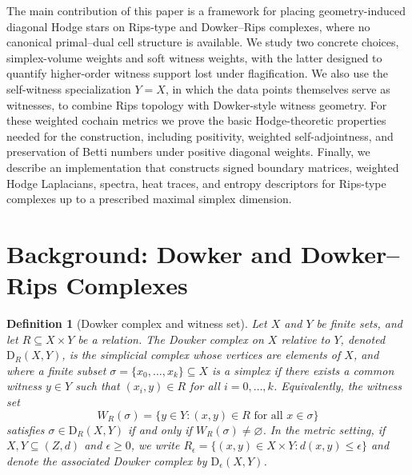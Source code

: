 \documentclass[11pt]{amsart}
\theoremstyle{plain}
\newtheorem{definition}[theorem]{Definition}
\newcommand{\Dow}{\mathrm{D}}
\begin{document}
The main contribution of this paper is a framework for placing geometry-induced diagonal Hodge stars
on Rips-type and Dowker--Rips complexes, where no canonical primal--dual cell structure is
available. We study two concrete choices, simplex-volume weights and soft witness weights, with the
latter designed to quantify higher-order witness support lost under flagification. We also use the
self-witness specialization $Y=X$, in which the data points themselves serve as witnesses, to combine
Rips topology with Dowker-style witness geometry. For these weighted cochain metrics we prove the
basic Hodge-theoretic properties needed for the construction, including positivity, weighted
self-adjointness, and preservation of Betti numbers under positive diagonal weights. Finally, we
describe an implementation that constructs signed boundary matrices, weighted Hodge Laplacians,
spectra, heat traces, and entropy descriptors for Rips-type complexes up to a prescribed maximal
simplex dimension.

\section{Background: Dowker and Dowker--Rips Complexes}
\label{sec:background}

\begin{definition}[Dowker complex and witness set]
Let $X$ and $Y$ be finite sets, and let $R\subseteq X\times Y$ be a relation. The Dowker complex on
$X$ relative to $Y$, denoted $\Dow_R(X,Y)$, is the simplicial complex whose vertices are elements
of $X$, and where a finite subset $\sigma=\{x_0,\dots,x_k\}\subseteq X$ is a simplex if there
exists a common witness $y\in Y$ such that $(x_i,y)\in R$ for all $i=0,\dots,k$. Equivalently, the
witness set
\[
W_R(\sigma)=\{y\in Y : (x,y)\in R \text{ for all }x\in\sigma\}
\]
satisfies $\sigma\in\Dow_R(X,Y)$ if and only if $W_R(\sigma)\neq\varnothing$. In the metric
setting, if $X,Y\subseteq (Z,d)$ and $\epsilon\geq0$, we write
$R_\epsilon=\{(x,y)\in X\times Y:d(x,y)\leq\epsilon\}$ and denote the associated Dowker complex by
$\Dow_\epsilon(X,Y)$.
\end{definition}
\end{document}
